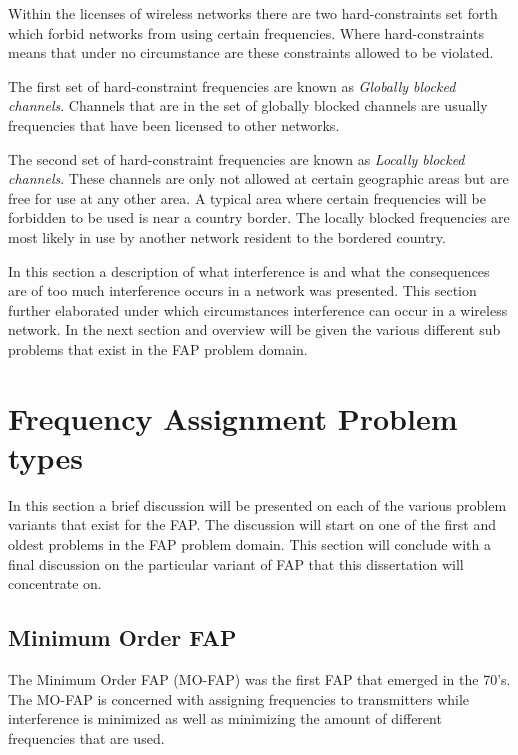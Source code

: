 Within the licenses of wireless networks there are two hard-constraints set forth which forbid networks from using certain frequencies. Where hard-constraints means that under no circumstance are these constraints allowed to be violated.

The first set of hard-constraint frequencies are known as \emph{Globally blocked channels}. Channels that are in the set of globally blocked channels are usually frequencies that have been licensed to other networks\cite{Eisenblatter,Karen2004,InterferenceOrientatedFAP}.

The second set of hard-constraint frequencies are known as \emph{Locally blocked channels}. These channels are only not allowed at certain geographic areas but are free for use at any other area\cite{Eisenblatter,Karen2004,InterferenceOrientatedFAP}. A typical area where certain frequencies will be forbidden to be used is near a country border\cite{Eisenblatter,Karen2004,InterferenceOrientatedFAP}. The locally blocked frequencies are most likely in use by another network resident to the bordered country.

In this section a description of what interference is and what the consequences are of too much interference occurs in a network was presented. This section further elaborated under which circumstances interference can occur in a wireless network. In the next section and overview will be given the various different sub problems that exist in the FAP problem domain.

\section{Frequency Assignment Problem types}
\label{sec:FAPVariants}
In this section a brief discussion will be presented on each of the various problem variants that exist for the FAP. The discussion will start on one of the first and oldest problems in the FAP problem domain. This section will conclude with a final discussion on the particular variant of FAP that this dissertation will concentrate on.
\subsection{Minimum Order FAP}
The Minimum Order FAP (MO-FAP) was the first FAP that emerged in the 70's. The MO-FAP is concerned with assigning frequencies to transmitters while interference is minimized as well as minimizing the amount of different frequencies that are used\cite{Karen2004,MontemanniThesis}. 

